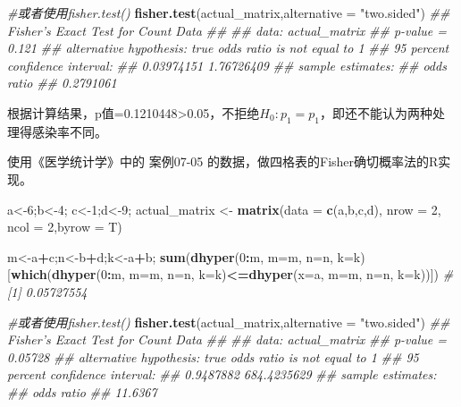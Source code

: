 \documentclass[
]{article}
\newenvironment{Shaded}{\begin{snugshade}}{\end{snugshade}}
\newcommand{\CommentTok}[1]{\textcolor[rgb]{0.56,0.35,0.01}{\textit{#1}}}
\newcommand{\DataTypeTok}[1]{\textcolor[rgb]{0.13,0.29,0.53}{#1}}
\newcommand{\DecValTok}[1]{\textcolor[rgb]{0.00,0.00,0.81}{#1}}
\newcommand{\KeywordTok}[1]{\textcolor[rgb]{0.13,0.29,0.53}{\textbf{#1}}}
\newcommand{\NormalTok}[1]{#1}
\newcommand{\OperatorTok}[1]{\textcolor[rgb]{0.81,0.36,0.00}{\textbf{#1}}}
\newcommand{\StringTok}[1]{\textcolor[rgb]{0.31,0.60,0.02}{#1}}
\begin{document}
\begin{Shaded}
\begin{Highlighting}[]
\CommentTok{#或者使用fisher.test()}
\KeywordTok{fisher.test}\NormalTok{(actual_matrix,}\DataTypeTok{alternative =} \StringTok{"two.sided"}\NormalTok{)}
\CommentTok{##      Fisher's Exact Test for Count Data}
\CommentTok{##  }
\CommentTok{##  data:  actual_matrix}
\CommentTok{##  p-value = 0.121}
\CommentTok{##  alternative hypothesis: true odds ratio is not equal to 1}
\CommentTok{##  95 percent confidence interval:}
\CommentTok{##   0.03974151 1.76726409}
\CommentTok{##  sample estimates:}
\CommentTok{##  odds ratio }
\CommentTok{##   0.2791061 }
\end{Highlighting}
\end{Shaded}

根据计算结果，p值=0.1210448\textgreater0.05，不拒绝\(H_0: p_1=p_1\)，即还不能认为两种处理得感染率不同。

使用《医学统计学》中的 案例07-05 的数据，做四格表的Fisher确切概率法的R实现。

\begin{Shaded}
\begin{Highlighting}[]
\NormalTok{a<-}\DecValTok{6}\NormalTok{;b<-}\DecValTok{4}\NormalTok{;}
\NormalTok{c<-}\DecValTok{1}\NormalTok{;d<-}\DecValTok{9}\NormalTok{;}
\NormalTok{actual_matrix <-}\StringTok{ }\KeywordTok{matrix}\NormalTok{(}\DataTypeTok{data =} \KeywordTok{c}\NormalTok{(a,b,c,d), }\DataTypeTok{nrow =} \DecValTok{2}\NormalTok{, }\DataTypeTok{ncol =} \DecValTok{2}\NormalTok{,}\DataTypeTok{byrow =}\NormalTok{ T)}

\NormalTok{m<-a}\OperatorTok{+}\NormalTok{c;n<-b}\OperatorTok{+}\NormalTok{d;k<-a}\OperatorTok{+}\NormalTok{b;}
\KeywordTok{sum}\NormalTok{(}\KeywordTok{dhyper}\NormalTok{(}\DecValTok{0}\OperatorTok{:}\NormalTok{m, }\DataTypeTok{m=}\NormalTok{m, }\DataTypeTok{n=}\NormalTok{n, }\DataTypeTok{k=}\NormalTok{k)[}\KeywordTok{which}\NormalTok{(}\KeywordTok{dhyper}\NormalTok{(}\DecValTok{0}\OperatorTok{:}\NormalTok{m, }\DataTypeTok{m=}\NormalTok{m, }\DataTypeTok{n=}\NormalTok{n, }\DataTypeTok{k=}\NormalTok{k)}\OperatorTok{<=}\KeywordTok{dhyper}\NormalTok{(}\DataTypeTok{x=}\NormalTok{a, }\DataTypeTok{m=}\NormalTok{m, }\DataTypeTok{n=}\NormalTok{n, }\DataTypeTok{k=}\NormalTok{k))])}
\CommentTok{# [1] 0.05727554}

\CommentTok{#或者使用fisher.test()}
\KeywordTok{fisher.test}\NormalTok{(actual_matrix,}\DataTypeTok{alternative =} \StringTok{"two.sided"}\NormalTok{)}
\CommentTok{##      Fisher's Exact Test for Count Data}
\CommentTok{##  }
\CommentTok{##  data:  actual_matrix}
\CommentTok{##  p-value = 0.05728}
\CommentTok{##  alternative hypothesis: true odds ratio is not equal to 1}
\CommentTok{##  95 percent confidence interval:}
\CommentTok{##     0.9487882 684.4235629}
\CommentTok{##  sample estimates:}
\CommentTok{##  odds ratio }
\CommentTok{##     11.6367 }
\end{Highlighting}
\end{Shaded}
\end{document}
